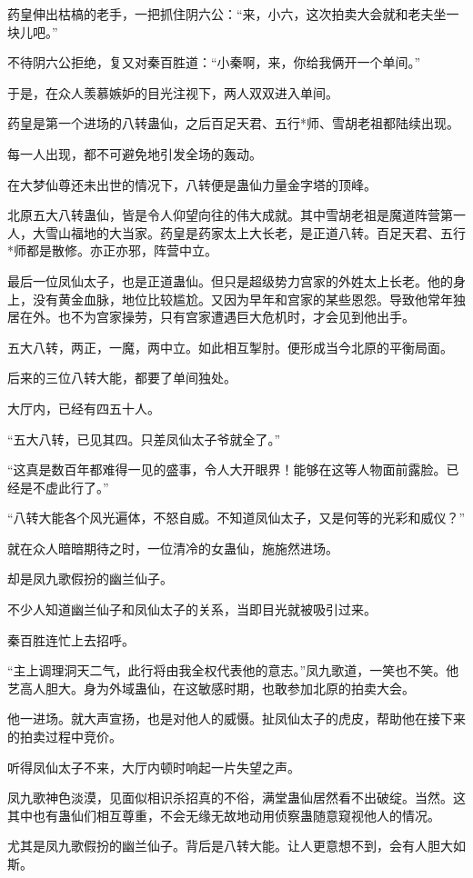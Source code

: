 \begin{this_body}
药皇伸出枯槁的老手，一把抓住阴六公：“来，小六，这次拍卖大会就和老夫坐一块儿吧。”

不待阴六公拒绝，复又对秦百胜道：“小秦啊，来，你给我俩开一个单间。”

于是，在众人羡慕嫉妒的目光注视下，两人双双进入单间。

药皇是第一个进场的八转蛊仙，之后百足天君、五行*师、雪胡老祖都陆续出现。

每一人出现，都不可避免地引发全场的轰动。

在大梦仙尊还未出世的情况下，八转便是蛊仙力量金字塔的顶峰。

北原五大八转蛊仙，皆是令人仰望向往的伟大成就。其中雪胡老祖是魔道阵营第一人，大雪山福地的大当家。药皇是药家太上大长老，是正道八转。百足天君、五行*师都是散修。亦正亦邪，阵营中立。

最后一位凤仙太子，也是正道蛊仙。但只是超级势力宫家的外姓太上长老。他的身上，没有黄金血脉，地位比较尴尬。又因为早年和宫家的某些恩怨。导致他常年独居在外。也不为宫家操劳，只有宫家遭遇巨大危机时，才会见到他出手。

五大八转，两正，一魔，两中立。如此相互掣肘。便形成当今北原的平衡局面。

后来的三位八转大能，都要了单间独处。

大厅内，已经有四五十人。

“五大八转，已见其四。只差凤仙太子爷就全了。”

“这真是数百年都难得一见的盛事，令人大开眼界！能够在这等人物面前露脸。已经是不虚此行了。”

“八转大能各个风光遍体，不怒自威。不知道凤仙太子，又是何等的光彩和威仪？”

就在众人暗暗期待之时，一位清冷的女蛊仙，施施然进场。

却是凤九歌假扮的幽兰仙子。

不少人知道幽兰仙子和凤仙太子的关系，当即目光就被吸引过来。

秦百胜连忙上去招呼。

“主上调理洞天二气，此行将由我全权代表他的意志。”凤九歌道，一笑也不笑。他艺高人胆大。身为外域蛊仙，在这敏感时期，也敢参加北原的拍卖大会。

他一进场。就大声宣扬，也是对他人的威慑。扯凤仙太子的虎皮，帮助他在接下来的拍卖过程中竞价。

听得凤仙太子不来，大厅内顿时响起一片失望之声。

凤九歌神色淡漠，见面似相识杀招真的不俗，满堂蛊仙居然看不出破绽。当然。这其中也有蛊仙们相互尊重，不会无缘无故地动用侦察蛊随意窥视他人的情况。

尤其是凤九歌假扮的幽兰仙子。背后是八转大能。让人更意想不到，会有人胆大如斯。


\end{this_body}
